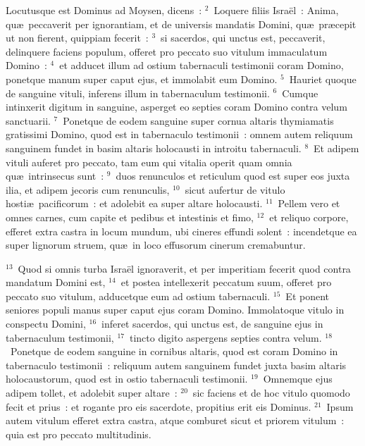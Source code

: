 \lettrine[lines=3,image=true,loversize=0.05,lraise=-0.03]{L}{}ocutusque est Dominus ad Moysen, dicens~:
${}^{2}$~Loquere filiis Isra\"el~: Anima, qu\ae\ peccaverit per ignorantiam, et de universis mandatis Domini, qu\ae\ pr\ae cepit ut non fierent, quippiam fecerit~:
${}^{3}$~si sacerdos, qui unctus est, peccaverit, delinquere faciens populum, offeret pro peccato suo vitulum immaculatum Domino~:
${}^{4}$~et adducet illum ad ostium tabernaculi testimonii coram Domino, ponetque manum super caput ejus, et immolabit eum Domino.
${}^{5}$~Hauriet quoque de sanguine vituli, inferens illum in tabernaculum testimonii.
${}^{6}$~Cumque intinxerit digitum in sanguine, asperget eo septies coram Domino contra velum sanctuarii.
${}^{7}$~Ponetque de eodem sanguine super cornua altaris thymiamatis gratissimi Domino, quod est in tabernaculo testimonii~: omnem autem reliquum sanguinem fundet in basim altaris holocausti in introitu tabernaculi.
${}^{8}$~Et adipem vituli auferet pro peccato, tam eum qui vitalia operit quam omnia qu\ae\ intrinsecus sunt~:
${}^{9}$~duos renunculos et reticulum quod est super eos juxta ilia, et adipem jecoris cum renunculis,
${}^{10}$~sicut aufertur de vitulo hosti\ae\ pacificorum~: et adolebit ea super altare holocausti.
${}^{11}$~Pellem vero et omnes carnes, cum capite et pedibus et intestinis et fimo,
${}^{12}$~et reliquo corpore, efferet extra castra in locum mundum, ubi cineres effundi solent~: incendetque ea super lignorum struem, qu\ae\ in loco effusorum cinerum cremabuntur.


${}^{13}$~Quod si omnis turba Isra\"el ignoraverit, et per imperitiam fecerit quod contra mandatum Domini est,
${}^{14}$~et postea intellexerit peccatum suum, offeret pro peccato suo vitulum, adducetque eum ad ostium tabernaculi.
${}^{15}$~Et ponent seniores populi manus super caput ejus coram Domino. Immolatoque vitulo in conspectu Domini,
${}^{16}$~inferet sacerdos, qui unctus est, de sanguine ejus in tabernaculum testimonii,
${}^{17}$~tincto digito aspergens septies contra velum.
${}^{18}$~Ponetque de eodem sanguine in cornibus altaris, quod est coram Domino in tabernaculo testimonii~: reliquum autem sanguinem fundet juxta basim altaris holocaustorum, quod est in ostio tabernaculi testimonii.
${}^{19}$~Omnemque ejus adipem tollet, et adolebit super altare~:
${}^{20}$~sic faciens et de hoc vitulo quomodo fecit et prius~: et rogante pro eis sacerdote, propitius erit eis Dominus.
${}^{21}$~Ipsum autem vitulum efferet extra castra, atque comburet sicut et priorem vitulum~: quia est pro peccato multitudinis.


